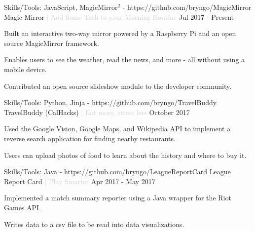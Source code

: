 

\begin{cventries}

  \cventry
  {Skills/Tools: JavaScript, MagicMirror$^2$ - https://github.com/bryngo/MagicMirror} %
  {Magic Mirror \textcolor{lightgray}{| Add Some Tech to your Morning Routine}} %
  {} %
  {Jul 2017 - Present} %
  {
  \begin{cvitems} %
    \item {Built an interactive two-way mirror powered by a Raspberry Pi and an open source MagicMirror framework.}
    \item {Enables users to see the weather, read the news, and more - all without using a mobile device.}
    \item {Contributed an open source slideshow module to the developer community.}
  \end{cvitems}
  }

  \cventry
  {Skills/Tools: Python, Jinja - https://github.com/bryngo/TravelBuddy} %
  {TravelBuddy (CalHacks) \textcolor{lightgray}{| Eat more, stress less}} %
  {} %
  {October 2017} %
  {
  \begin{cvitems} %
    \item {Used the Google Vision, Google Maps, and Wikipedia API to implement a reverse search application for finding nearby restaurants.}
    \item {Users can upload photos of food to learn about the history and where to buy it.}
  \end{cvitems}
  }


  \cventry
  {Skills/Tools: Java - https://github.com/bryngo/LeagueReportCard} %
  {League Report Card \textcolor{lightgray}{| Play Smarter}} %
  {} %
  {Apr 2017 - May 2017} %
  {
  \begin{cvitems} %
    \item {Implemented a match summary reporter using a Java wrapper for the Riot Games API.}
    \item {Writes data to a csv file to be read into data visualizations.}
  \end{cvitems}
  }


\end{cventries}
